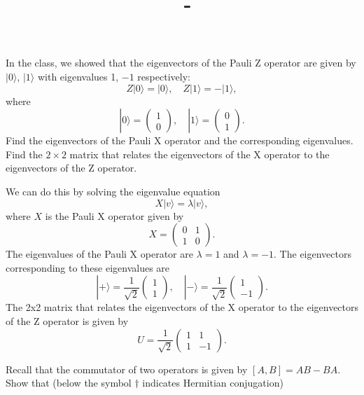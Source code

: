 \documentclass[answers,12pt,addpoints]{exam}
\author{\name}
\title{\course \ - \assignment}
\begin{document}
\maketitle
\begin{questions}
    \question In the class, we showed that the eigenvectors of the Pauli Z operator are given by \(|0\rangle\), \(|1\rangle\) with eigenvalues 1, \(-1\) respectively:
    \[ Z|0\rangle = |0\rangle, \quad Z|1\rangle = -|1\rangle, \]
    where
    \[ |0\rangle = \begin{pmatrix} 1 \\ 0 \end{pmatrix}, \quad |1\rangle = \begin{pmatrix} 0 \\ 1 \end{pmatrix}. \]
    Find the eigenvectors of the Pauli X operator and the corresponding eigenvalues. Find the \(2 \times 2\) matrix that relates the eigenvectors of the X operator to the eigenvectors of the Z operator.
    \begin{solution}
        We can do this by solving the eigenvalue equation
        \[ X|v\rangle = \lambda |v\rangle, \]
        where \(X\) is the Pauli X operator given by
        \[ X = \begin{pmatrix} 0 & 1 \\ 1 & 0 \end{pmatrix}. \]
        The eigenvalues of the Pauli X operator are \(\lambda = 1\) and \(\lambda = -1\). The eigenvectors corresponding to these eigenvalues are
        \[ |+\rangle = \frac{1}{\sqrt{2}} \begin{pmatrix} 1 \\ 1 \end{pmatrix}, \quad |-\rangle = \frac{1}{\sqrt{2}} \begin{pmatrix} 1 \\ -1 \end{pmatrix}. \]
        The 2x2 matrix that relates the eigenvectors of the X operator to the eigenvectors of the Z operator is given by
        \[ U = \frac{1}{\sqrt{2}}\begin{pmatrix} 1 & 1 \\ 1 & -1 \end{pmatrix}. \]
    \end{solution}
    \question  Recall that the commutator of two operators is given by \([A, B] = AB - BA\). Show that (below the symbol \(\dagger\) indicates Hermitian conjugation)
\end{questions}
\end{document}
